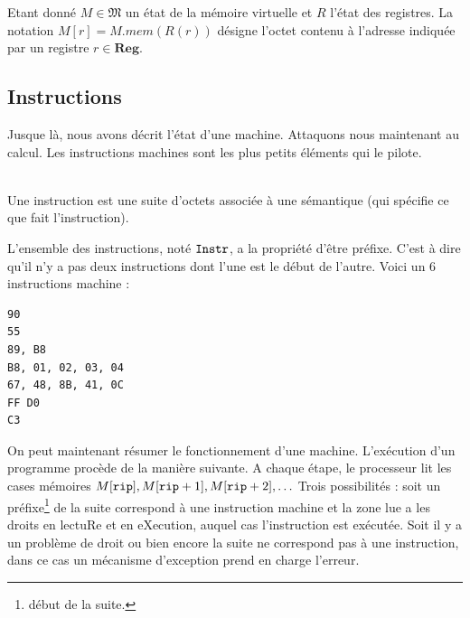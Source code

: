 \documentclass{book}
\newenvironment{formalisme}[1]{%
	\def\FrameCommand{\fboxrule=\FrameRule\fboxsep=\FrameSep \fcolorbox{red!10}{red!5}}%
	\MakeFramed {\advance\hsize-\width \FrameRestore}
	\noindent {\bf #1}\\
}%
{\endMakeFramed}
\newcommand{\rip}{{\tt rip}\xspace}
\newcommand{\Memory}{{\mathfrak{M}}}
\newcommand{\Reg}{{\mathbf{Reg}}}
\begin{document}

Etant donné $M \in \Memory$ un état de la mémoire virtuelle et $R$ l'état des registres. La notation $M[r] = M.mem(R(r))$ désigne l'octet contenu à l'adresse indiquée par un registre $r \in \Reg$.%


\subsection{Instructions}

\newcommand{\Instr}{{\tt Instr}}

Jusque là, nous avons décrit l'état d'une machine. Attaquons nous maintenant au calcul. Les instructions machines sont les plus petits éléments qui le pilote.

\begin{formalisme}{Instruction}
Une instruction est une suite d'octets associée à une sémantique (qui spécifie ce que fait l'instruction). 
	
L'ensemble des instructions, noté $\Instr$, a la propriété d'être préfixe. C'est à dire qu'il n'y a pas deux instructions dont l'une est le début de l'autre.  	
\end{formalisme}
Voici un 6 instructions machine : 
\begin{verbatim}
90
55
89, B8
B8, 01, 02, 03, 04
67, 48, 8B, 41, 0C
FF D0
C3
\end{verbatim}

On peut maintenant résumer le fonctionnement d'une machine.  L'exécution d'un programme procède de la manière suivante. A chaque étape, le processeur lit les cases mémoires $M[\rip], M[\rip+1], M[\rip+2], \ldots$ Trois possibilités :  soit un préfixe\footnote{début de la suite.} de la suite correspond à une instruction machine  et la zone lue a les droits en lectuRe et en eXecution, auquel cas l'instruction est exécutée. Soit il y a un problème de droit ou bien encore la suite ne correspond pas à une instruction, dans ce cas un mécanisme d'exception prend en charge l'erreur. 
\end{document}
